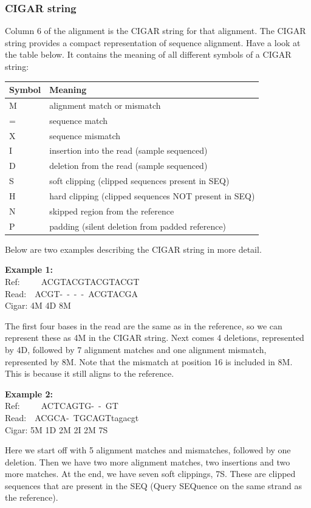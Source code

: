 \documentclass[11pt]{article}
\begin{document}
    \hypertarget{cigar-string}{%
\subsubsection{CIGAR string}\label{cigar-string}}

Column 6 of the alignment is the CIGAR string for that alignment. The
CIGAR string provides a compact representation of sequence alignment.
Have a look at the table below. It contains the meaning of all different
symbols of a CIGAR string:

\begin{longtable}[]{@{}ll@{}}
\hline
Symbol & Meaning\tabularnewline
\hline
\endhead
M & alignment match or mismatch\tabularnewline
= & sequence match\tabularnewline
X & sequence mismatch\tabularnewline
I & insertion into the read (sample sequenced)\tabularnewline
D & deletion from the read (sample sequenced)\tabularnewline
S & soft clipping (clipped sequences present in SEQ)\tabularnewline
H & hard clipping (clipped sequences NOT present in SEQ)\tabularnewline
N & skipped region from the reference\tabularnewline
P & padding (silent deletion from padded reference)\tabularnewline
\hline
\end{longtable}

Below are two examples describing the CIGAR string in more detail.

\textbf{Example 1:}\\
Ref:~~~~~ACGTACGTACGTACGT\\
Read:~~ACGT-~-~-~-~ACGTACGA\\
Cigar: 4M 4D 8M

The first four bases in the read are the same as in the reference, so we
can represent these as 4M in the CIGAR string. Next comes 4 deletions,
represented by 4D, followed by 7 alignment matches and one alignment
mismatch, represented by 8M. Note that the mismatch at position 16 is
included in 8M. This is because it still aligns to the reference.

\textbf{Example 2:}\\
Ref:~~~~~ACTCAGTG-~-~GT\\
Read:~~ACGCA-~TGCAGTtagacgt\\
Cigar: 5M 1D 2M 2I 2M 7S

Here we start off with 5 alignment matches and mismatches, followed by
one deletion. Then we have two more alignment matches, two insertions
and two more matches. At the end, we have seven soft clippings, 7S.
These are clipped sequences that are present in the SEQ (Query SEQuence
on the same strand as the reference).
\end{document}
